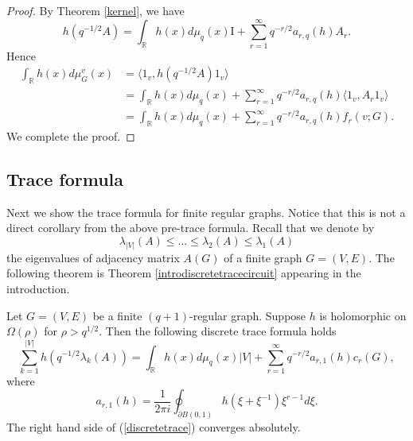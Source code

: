\documentclass{article}
\begin{document}
\begin{proof}
    By Theorem \ref{kernel}, we have
    \begin{equation*}
        h(q^{-1/2}A)=\int_{\mathbb{R}} h(x)d\mu_q(x)\mathrm{I}+\sum_{r=1}^{\infty}q^{-r/2}a_{r,q}(h) A_r.
    \end{equation*}
    Hence $$
    \begin{aligned}
    \int_{\mathbb{R}} h(x) d\mu_{G}^{v}(x)&=\langle \mathrm{1}_v, h(q^{-1/2}A) \mathrm{1}_v \rangle\\
    &=\int_{\mathbb{R}} h(x) d\mu_q(x)+\sum_{r=1}^{\infty}q^{-r/2}a_{r,q}(h)\langle \mathrm{1}_v, A_r \mathrm{1}_v \rangle\\
    &=\int_{\mathbb{R}} h(x) d\mu_q(x)+\sum_{r=1}^{\infty}q^{-r/2}a_{r,q}(h) f_r(v;G).
    \end{aligned}
    $$
    We complete the proof.
\end{proof}

\subsection{Trace formula}
Next we show the trace formula for finite regular graphs. Notice that this is not a direct corollary from the above pre-trace formula. Recall that we denote by 
\[\lambda_{|V|}(A) \leq ... \leq \lambda_2(A) \leq \lambda_1(A)\]
the eigenvalues of adjacency matrix $A(G)$ of a finite graph $G=(V,E)$.
The following theorem is Theorem \ref{introdiscretetracecircuit} appearing in the introduction.
\begin{theorem}\label{discretetracecircuit}
    Let $G=(V,E)$ be a finite $(q+1)$-regular graph. Suppose $h$ is holomorphic on $\Omega(\rho)$ for $\rho>q^{1/2}$. Then
    the following discrete trace formula holds
    \begin{equation}\label{discretetrace}
\sum_{k=1}^{|V|} h(q^{-1/2}\lambda_k(A))=
\int_{\mathbb{R}} h(x) d\mu_q(x)|V|+\sum_{r=1}^{\infty}q^{-r/2}a_{r,1}(h)c_r(G),
\end{equation}
    where 
    \begin{equation}\label{arhtrace}
        a_{r,1}(h)=\frac{1}{2\pi i}\oint_{\partial B(0,1)} h(\xi+\xi^{-1})\xi^{r-1}d\xi.
    \end{equation}
The right hand side of (\ref{discretetrace}) converges absolutely. 
\end{theorem}
\end{document}
